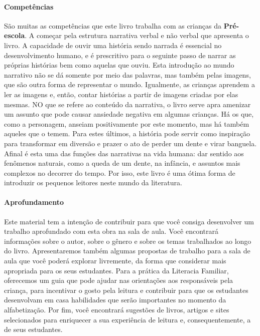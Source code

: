 \documentclass[11pt]{extarticle}
\begin{document}
\paragraph{Competências} 
São muitas as competências que este livro trabalha com as crianças
da \textbf{Pré-escola}. A começar pela estrutura narrativa verbal e não verbal
que apresenta o livro. A capacidade de ouvir uma história sendo narrada é essencial no 
desenvolvimento humano, e é prescritivo para o seguinte passo de narrar as próprias
histórias bem como aquelas que ouviu. Esta introdução ao mundo narrativo não se dá
somente por meio das palavras, mas também pelas imagens, que são outra forma de 
representar o mundo. Igualmente, as crianças aprendem a ler as imagens e, então, 
contar histórias a partir de imagens criadas por elas mesmas. 
NO que se refere ao conteúdo da narrativa, o livro serve apra amenizar um assunto
que pode causar ansiedade negativa em algumas crianças. Há os que, como a personagem,
anseiam positivamente por este momento, mas há também aqueles que o temem. 
Para estes últimos, a história pode servir como inspiração para transformar em 
diversão e prazer o ato de perder um dente e virar banguela. 
Afinal é esta uma das funções das narrativas na vida humana: dar sentido aos 
fenômenos naturais, como a queda de um dente, na infância, e assuntos mais complexos
no decorrer do tempo. Por isso, este livro é uma ótima forma de introduzir os pequenos
leitores neste mundo da literatura. 


\paragraph{Aprofundamento} 
Este material tem a intenção de contribuir para que você consiga desenvolver um trabalho aprofundado 
com esta obra na sala de aula. Você encontrará informações sobre o autor, sobre 
o gênero e sobre os temas trabalhados ao longo do livro. Apresentaremos também 
algumas propostas de trabalho para a sala de aula que você poderá explorar livremente, 
da forma que considerar mais apropriada para os seus estudantes. Para a prática 
da Literacia Familiar, oferecemos um guia que pode ajudar nas orientações aos 
responsáveis pela criança, para incentivar o gosto pela leitura e contribuir para 
que os estudantes desenvolvam em casa habilidades que serão importantes no momento 
da alfabetização. Por fim, você encontrará sugestões de livros, artigos e sites 
selecionados para enriquecer a sua experiência de leitura e, 
consequentemente, a de seus estudantes.
\end{document}
